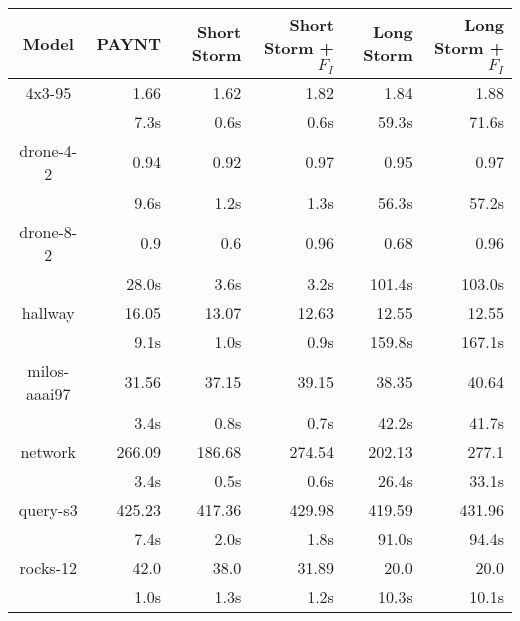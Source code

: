 \documentclass{article}
\begin{document}
\begin{table}
\begin{tabular}{|c|r|r|r|r|r|}
\hline

Model & PAYNT & Short Storm & Short Storm + $F_{I}$ & Long Storm & Long Storm + $F_{I}$ \\ \hline 

4x3-95 & 1.66 & 1.62 & 1.82 & 1.84 & 1.88 \\
 & 7.3s & 0.6s & 0.6s & 59.3s & 71.6s \\
\hline
drone-4-2 & 0.94 & 0.92 & 0.97 & 0.95 & 0.97 \\
 & 9.6s & 1.2s & 1.3s & 56.3s & 57.2s \\
\hline
drone-8-2 & 0.9 & 0.6 & 0.96 & 0.68 & 0.96 \\
 & 28.0s & 3.6s & 3.2s & 101.4s & 103.0s \\
\hline
hallway & 16.05 & 13.07 & 12.63 & 12.55 & 12.55 \\
 & 9.1s & 1.0s & 0.9s & 159.8s & 167.1s \\
\hline
milos-aaai97 & 31.56 & 37.15 & 39.15 & 38.35 & 40.64 \\
 & 3.4s & 0.8s & 0.7s & 42.2s & 41.7s \\
\hline
network & 266.09 & 186.68 & 274.54 & 202.13 & 277.1 \\
 & 3.4s & 0.5s & 0.6s & 26.4s & 33.1s \\
\hline
query-s3 & 425.23 & 417.36 & 429.98 & 419.59 & 431.96 \\
 & 7.4s & 2.0s & 1.8s & 91.0s & 94.4s \\
\hline
rocks-12 & 42.0 & 38.0 & 31.89 & 20.0 & 20.0 \\
 & 1.0s & 1.3s & 1.2s & 10.3s & 10.1s \\
\hline
\end{tabular}
\end{table}
\end{document}
